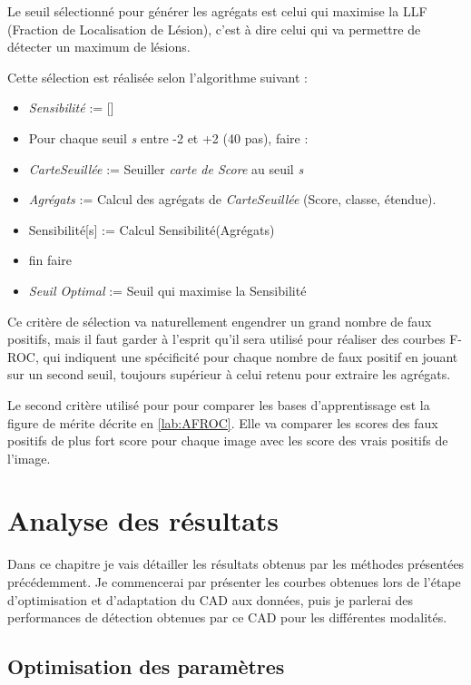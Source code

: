 Le seuil sélectionné pour générer les agrégats est celui qui maximise la LLF (Fraction de Localisation de Lésion), c'est à dire celui qui va permettre de détecter un maximum de lésions. 

Cette sélection est réalisée selon l'algorithme suivant :

\begin{itemize}
 \item \emph{Sensibilité} := []
 \item Pour chaque seuil \emph{s} entre -2 et +2 (40 pas), faire :
 \item \hspace{1cm}\emph{CarteSeuillée} := Seuiller \emph{carte de Score} au seuil \emph{s}
 \item \hspace{1cm}\emph{Agrégats} := Calcul des agrégats de \emph{CarteSeuillée} (Score, classe, étendue).
 \item \hspace{1cm}Sensibilité[s] := Calcul Sensibilité(Agrégats)
 \item fin faire
 \item \emph{Seuil Optimal} := Seuil qui maximise la Sensibilité
\end{itemize}

Ce critère de sélection va naturellement engendrer un grand nombre de faux positifs, mais il faut garder à l'esprit qu'il sera utilisé pour réaliser des courbes F-ROC, qui indiquent une spécificité pour chaque nombre de faux positif en jouant sur un second seuil, toujours supérieur à celui retenu pour extraire les agrégats.

Le second critère utilisé pour pour comparer les bases d'apprentissage est la figure de mérite décrite en \ref{lab:AFROC}. Elle va comparer les scores des faux positifs de plus fort score pour chaque image avec les score  des vrais positifs de l'image.


\chapter{Analyse des résultats}

Dans ce chapitre je vais détailler les résultats obtenus par les méthodes présentées précédemment. Je commencerai par présenter les courbes obtenues lors de l'étape d'optimisation et d'adaptation du CAD aux données, puis je parlerai des performances de détection obtenues par ce CAD pour les différentes modalités.

\section{Optimisation des paramètres}

